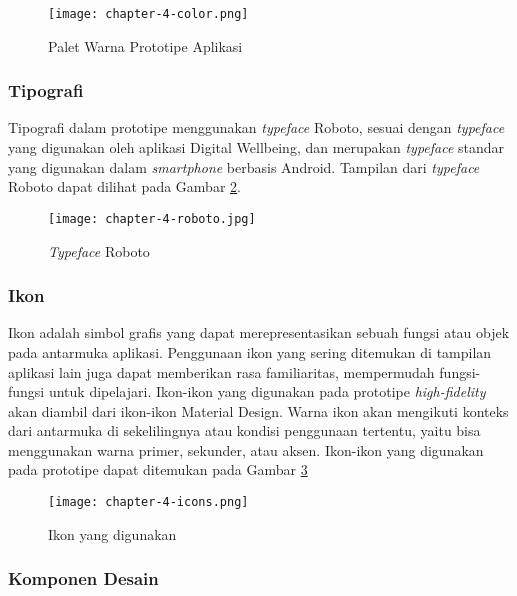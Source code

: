 \begin{figure}[h]
  \centering
  \texttt{[image: chapter-4-color.png]}
  \caption{Palet Warna Prototipe Aplikasi}
  \label{img:pallete}
\end{figure}
\FloatBarrier

\subsubsection{Tipografi}
\label{subsubsec:aspek_tipografi}
Tipografi dalam prototipe menggunakan \textit{typeface} Roboto, sesuai dengan \textit{typeface} yang digunakan oleh aplikasi Digital Wellbeing, dan merupakan \textit{typeface} standar yang digunakan dalam \textit{smartphone} berbasis Android. Tampilan dari \textit{typeface} Roboto dapat dilihat pada Gambar \ref{img:typeface}.

\begin{figure}[h]
  \centering
  \texttt{[image: chapter-4-roboto.jpg]}
  \caption{\textit{Typeface} Roboto}
  \label{img:typeface}
\end{figure}
\FloatBarrier

\subsubsection{Ikon}
\label{subsubsec:aspek_ikon}
Ikon adalah simbol grafis yang dapat merepresentasikan sebuah fungsi atau objek pada antarmuka aplikasi. Penggunaan ikon yang sering ditemukan di tampilan aplikasi lain juga dapat memberikan rasa familiaritas, mempermudah fungsi-fungsi untuk dipelajari. Ikon-ikon yang digunakan pada prototipe \textit{high-fidelity} akan diambil dari ikon-ikon Material Design. Warna ikon akan mengikuti konteks dari antarmuka di sekelilingnya atau kondisi penggunaan tertentu, yaitu bisa menggunakan warna primer, sekunder, atau aksen. Ikon-ikon yang digunakan pada prototipe dapat ditemukan pada Gambar \ref{img:icons}

\begin{figure}[h]
  \centering
  \texttt{[image: chapter-4-icons.png]}
  \caption{Ikon yang digunakan}
  \label{img:icons}
\end{figure}
\FloatBarrier
 
\subsubsection{Komponen Desain}
\label{subsubsec:aspek_komponen}

